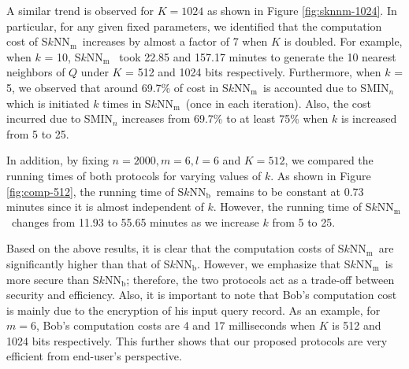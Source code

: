 \documentclass{article}
\newcommand{\sknnb}{S$k$NN$_\textrm{b}$}
\newcommand{\sknnm}{S$k$NN$_\textrm{m}$}
\begin{document}
A similar trend is observed for $K=1024$ as shown in Figure \ref{fig:sknnm-1024}. In 
particular, for any given fixed parameters, we identified 
that the computation cost of \sknnm~increases by almost a factor 
of 7 when $K$ is doubled. For example, when $k$ = 10, \sknnm~ took 22.85 and  
157.17 minutes to generate the 10 nearest neighbors of $Q$ 
under $K$ = 512 and 1024 bits respectively. Furthermore, 
when $k$ = 5, we observed that around 69.7\% of cost in \sknnm~is accounted due to SMIN$_n$ which is 
initiated $k$ times in \sknnm~(once in each iteration). Also, the cost incurred 
due to SMIN$_n$ increases from 69.7\% to at least 75\% when $k$ is increased from 
5 to 25.

In addition, by fixing $n=2000, m=6, l=6$ and $K=512$, we compared the 
running times of both protocols for varying values of $k$. As shown in Figure \ref{fig:comp-512}, 
the running time of \sknnb~remains to be constant at 0.73 minutes since it 
is almost independent of $k$. However, 
the running time of \sknnm~changes from 11.93 to 55.65 minutes as we increase $k$ from 5 to 25. 

Based on the above results, it is clear that the computation costs 
of \sknnm~are significantly higher than that of \sknnb. However, we emphasize that \sknnm~is 
more secure than \sknnb; therefore, the two protocols act as a trade-off between security 
and efficiency. Also, it is important to note that Bob's computation cost is mainly due to the 
encryption of his input query record. As an example, for $m=6$, Bob's computation costs are 4 and 17 milliseconds 
when $K$ is 512 and 1024 bits respectively. This further shows that our proposed protocols are very efficient from 
end-user's perspective.
\end{document}
